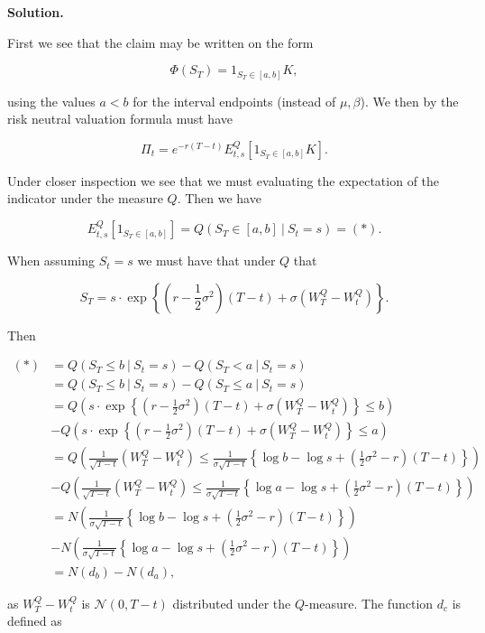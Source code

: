 \documentclass[
]{article}
\begin{document}
\textbf{Solution.}

First we see that the claim may be written on the form

\[
\Phi(S_T)=1_{S_T\in [a,b]}K,
\]

using the values \(a<b\) for the interval endpoints (instead of
\(\mu,\beta\)). We then by the risk neutral valuation formula must have

\[
\Pi_t=e^{-r(T-t)}E^Q_{t,s}[1_{S_T\in [a,b]}K].
\]

Under closer inspection we see that we must evaluating the expectation
of the indicator under the measure \(Q\). Then we have

\[
E^Q_{t,s}[1_{S_T\in [a,b]}]=Q(S_T\in[a,b]\ \vert\ S_t=s)=(*).
\]

When assuming \(S_t=s\) we must have that under \(Q\) that

\[
S_T=s\cdot \exp\left\{\left(r-\frac{1}{2}\sigma ^2\right)(T-t)+\sigma\left(W_T^Q-W_t^Q\right)\right\}.
\]

Then

\begin{align*}
(*)&=Q(S_T\le b\ \vert\ S_t=s)-Q(S_T<a\ \vert\ S_t=s)\\
&=Q(S_T\le b\ \vert\ S_t=s)-Q(S_T\le a\ \vert\ S_t=s)\\
&=Q\left(s\cdot \exp\left\{\left(r-\frac{1}{2}\sigma ^2\right)(T-t)+\sigma\left(W_T^Q-W_t^Q\right)\right\}\le b\right)\\
&-Q\left(s\cdot \exp\left\{\left(r-\frac{1}{2}\sigma ^2\right)(T-t)+\sigma\left(W_T^Q-W_t^Q\right)\right\}\le a\right)\\
&=Q\left(\frac{1}{\sqrt{T-t}}\left(W_T^Q-W_t^Q\right)\le\frac{1}{\sigma\sqrt{T-t}}\left\{\log b-\log s+\left(\frac{1}{2}\sigma ^2-r\right)(T-t)\right\}\right)\\
&-Q\left(\frac{1}{\sqrt{T-t}}\left(W_T^Q-W_t^Q\right)\le\frac{1}{\sigma\sqrt{T-t}}\left\{\log a-\log s+\left(\frac{1}{2}\sigma ^2-r\right)(T-t)\right\}\right)\\
&=N\left(\frac{1}{\sigma\sqrt{T-t}}\left\{\log b-\log s+\left(\frac{1}{2}\sigma ^2-r\right)(T-t)\right\}\right)\\
&-N\left(\frac{1}{\sigma\sqrt{T-t}}\left\{\log a-\log s+\left(\frac{1}{2}\sigma ^2-r\right)(T-t)\right\}\right)\\
&=N(d_b)-N(d_a),
\end{align*}

as \(W_T^Q-W_t^Q\) is \(\mathcal{N}(0,T-t)\) distributed under the
\(Q\)-measure. The function \(d_c\) is defined as
\end{document}
